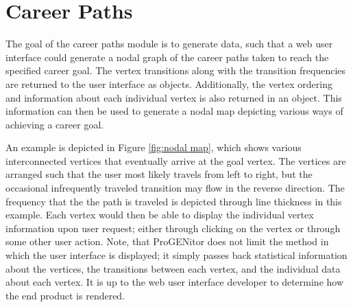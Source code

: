 \section{Career Paths}
\label{sect:career-paths}
The goal of the career paths module is to generate data, such that a web user
interface could generate a nodal graph of the career paths taken to reach the
specified career goal.  The vertex transitions along with the transition
frequencies are returned to the user interface as objects.  Additionally,
the vertex ordering and information about each individual vertex is also returned in
an object.  This information can then be used to generate a nodal map
depicting various ways of achieving a career goal.  

An example is depicted in Figure \ref{fig:nodal map}, which shows various
interconnected vertices that eventually arrive at the goal vertex.  The vertices
are arranged such that the user most likely travels from left to right, but the
occasional infrequently traveled transition may flow in the reverse direction. 
The frequency that the the path is traveled is depicted through line thickness
in this example.  Each vertex would then be able to display the individual vertex
information upon user request; either through clicking on the vertex or through
some other user action.  Note, that ProGENitor does not limit the method in
which the user interface is displayed; it simply passes back statistical
information about the vertices, the transitions between each vertex, and the
individual data about each vertex.  It is up to the web user interface developer
to determine how the end product is rendered.


\usetikzlibrary{shapes,arrows,chains}

